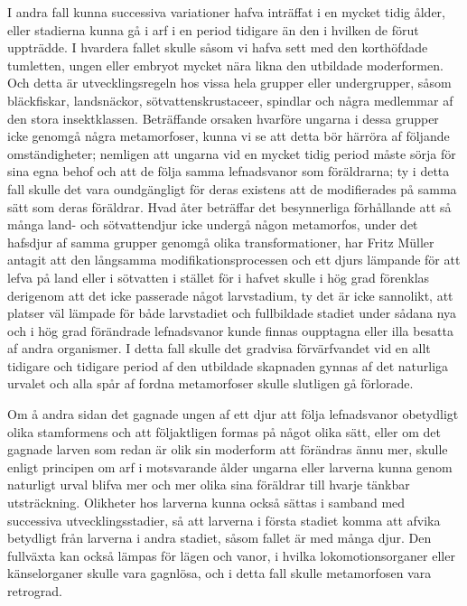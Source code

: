 I andra fall kunna successiva variationer hafva inträffat i en mycket tidig ålder, eller stadierna kunna gå i arf i en period tidigare än den i hvilken de förut uppträdde. I hvardera fallet skulle såsom vi hafva sett med den korthöfdade tumletten, ungen eller embryot mycket nära likna den utbildade moderformen. Och detta är utvecklingsregeln hos vissa hela grupper eller undergrupper, såsom bläckfiskar, landsnäckor, sötvattenskrustaceer, spindlar och några medlemmar af den stora insektklassen. Beträffande orsaken hvarföre ungarna i dessa grupper icke genomgå några metamorfoser, kunna vi se att detta bör härröra af följande omständigheter; nemligen att ungarna vid en mycket tidig period måste sörja för sina egna behof och att de följa samma lefnadsvanor som föräldrarna; ty i detta fall skulle det vara oundgängligt för deras existens att de modifierades på samma sätt som deras föräldrar. Hvad åter beträffar det besynnerliga förhållande att så många land- och sötvattendjur icke undergå någon metamorfos, under det hafsdjur af samma grupper genomgå olika transformationer, har Fritz Müller antagit att den långsamma modifikationsprocessen och ett djurs lämpande för att lefva på land eller i sötvatten i stället för i hafvet skulle i hög grad förenklas derigenom att det icke passerade något larvstadium, ty det är icke sannolikt, att platser väl lämpade för både larvstadiet och fullbildade stadiet under sådana nya och i hög grad förändrade lefnadsvanor kunde finnas oupptagna eller illa besatta af andra organismer. I detta fall skulle det gradvisa förvärfvandet vid en allt tidigare och tidigare period af den utbildade skapnaden gynnas af det naturliga urvalet och alla spår af fordna metamorfoser skulle slutligen gå förlorade.

Om å andra sidan det gagnade ungen af ett djur att följa lefnadsvanor obetydligt olika stamformens och att följaktligen formas på något olika sätt, eller om det gagnade larven som redan är olik sin moderform att förändras ännu mer, skulle enligt principen om arf i motsvarande ålder ungarna eller larverna kunna genom naturligt urval blifva mer och mer olika sina föräldrar till hvarje tänkbar utsträckning. Olikheter hos larverna kunna också sättas i samband med successiva utvecklingsstadier, så att larverna i första stadiet komma att afvika betydligt från larverna i andra stadiet, såsom fallet är med många djur. Den fullväxta kan också lämpas för lägen och vanor, i hvilka lokomotionsorganer eller känselorganer skulle vara gagnlösa, och i detta fall skulle metamorfosen vara retrograd.

